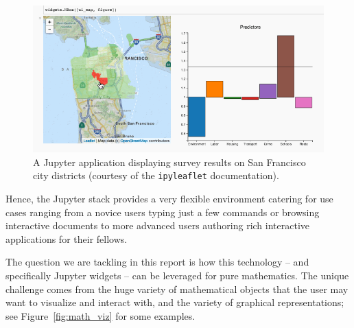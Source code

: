 \documentclass{deliverablereport}
\begin{document}
\begin{figure}[h]
  \begin{center}
    \includegraphics[width=\textwidth]{images/sc-ipyleaflet}
    \caption{A Jupyter application displaying survey results on San
      Francisco city districts \tiny{(courtesy of the \lstinline{ipyleaflet} documentation)}.}
  \label{fig:ipyleaflet}
  \end{center}
\end{figure}

Hence, the Jupyter stack provides a very flexible environment catering
for use cases ranging from a novice users typing just a few commands
or browsing interactive documents to more advanced users authoring
rich interactive applications for their fellows.

The question we are tackling in this report is how this technology --
and specifically Jupyter widgets -- can be leveraged for pure
mathematics. The unique challenge comes from the huge variety of
mathematical objects that the user may want to visualize and
interact with, and the variety of graphical representations;
see Figure~\ref{fig:math_viz} for some examples.

\end{document}

